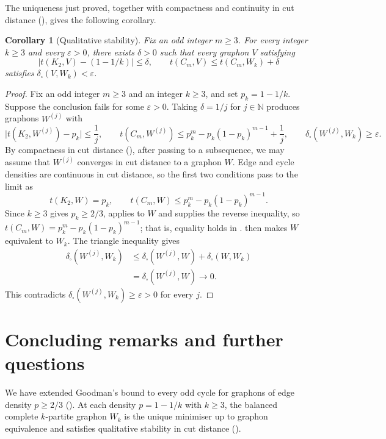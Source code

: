 \documentclass[11pt]{article}
\newtheorem{corollary}[theorem]{Corollary}
\theoremstyle{remark}
\numberwithin{equation}{section}
\newcommand{\tC}[2]{t(C_{#1},#2)}
\newcommand{\edens}[1]{t(K_{2},#1)}
\begin{document}
The uniqueness just proved, together with compactness and continuity in cut distance (), gives the following corollary.

\begin{corollary}[Qualitative stability]\label{cor:stability}
  Fix an odd integer $m\ge3$.
  For every integer $k\ge3$ and every $\varepsilon>0$, there exists $\delta>0$ such that every graphon $V$ satisfying
  \[
    \bigl|\edens V-(1-1/k)\bigr|\le\delta,
    \qquad
    \tC mV\le\tC m{W_k}+\delta
  \]
  satisfies $\delta_\square(V,W_k)<\varepsilon$.
\end{corollary}

\begin{proof}
  Fix an odd integer $m\ge3$ and an integer $k\ge3$, and set $p_k=1-1/k$.
  Suppose the conclusion fails for some $\varepsilon>0$.
  Taking $\delta=1/j$ for $j\in\mathbb N$ produces graphons $W^{(j)}$ with
  \[
    \bigl|\edens{W^{(j)}}-p_k\bigr|\le\frac1j,
    \qquad
    \tC m{W^{(j)}}\le p_k^m-p_k(1-p_k)^{m-1}+\frac1j,
    \qquad
    \delta_\square(W^{(j)},W_k)\ge\varepsilon .
  \]
  By compactness in cut distance (), after passing to a subsequence, we may assume that $W^{(j)}$ converges in cut distance to a graphon $W$.
  Edge and cycle densities are continuous in cut distance, so the first two conditions pass to the limit as
  \[
    \edens W=p_k,
    \qquad
    \tC mW\le p_k^m-p_k(1-p_k)^{m-1}.
  \]
  Since $k\ge3$ gives $p_k\ge2/3$,  applies to $W$ and supplies the reverse inequality, so $\tC mW=p_k^m-p_k(1-p_k)^{m-1}$; that is, equality holds in .
   then makes $W$ equivalent to $W_k$.
  The triangle inequality gives
  \[
    \begin{aligned}
      \delta_\square(W^{(j)},W_k)
      &\le\delta_\square(W^{(j)},W)+\delta_\square(W,W_k)\\
      &=\delta_\square(W^{(j)},W)\longrightarrow0.
    \end{aligned}
  \]
  This contradicts $\delta_\square(W^{(j)},W_k)\ge\varepsilon>0$
  for every $j$.
\end{proof}

\section{Concluding remarks and further questions}
\label{sec:conclusion}

We have extended Goodman's bound to every odd cycle for graphons of edge
density $p\ge2/3$ ().
At each density $p=1-1/k$ with $k\ge3$, the balanced complete
$k$-partite graphon $W_k$ is the unique minimiser up to graphon equivalence
and satisfies qualitative stability in cut distance ().
\end{document}
